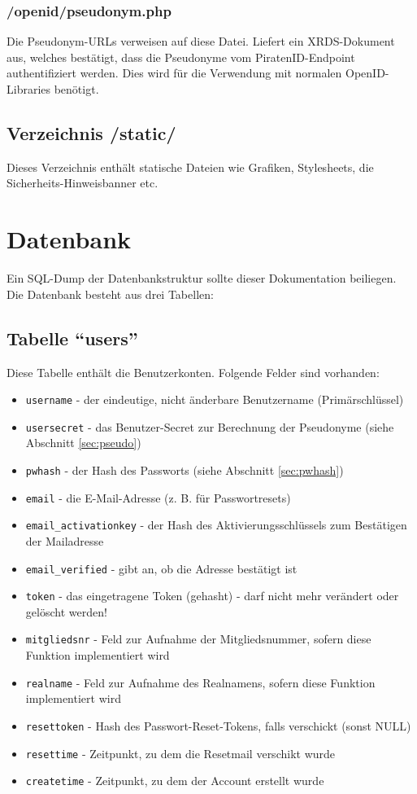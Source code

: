 \documentclass[parskip=half]{scrartcl}
\begin{document}
\subsubsection{/openid/pseudonym.php}
Die Pseudonym-URLs verweisen auf diese Datei.
Liefert ein XRDS-Dokument aus, welches bestätigt, dass die Pseudonyme vom PiratenID-Endpoint authentifiziert werden.
Dies wird für die Verwendung mit normalen OpenID-Libraries benötigt.


\subsection{Verzeichnis /static/}
Dieses Verzeichnis enthält statische Dateien wie Grafiken, Stylesheets, die Sicherheits-Hinweisbanner etc.


\section{Datenbank}
Ein SQL-Dump der Datenbankstruktur sollte dieser Dokumentation beiliegen.
Die Datenbank besteht aus drei Tabellen:

\subsection{Tabelle "`users"'}
Diese Tabelle enthält die Benutzerkonten. Folgende Felder sind vorhanden:
\begin{itemize}
	\item \texttt{username} - der eindeutige, nicht änderbare Benutzername (Primärschlüssel)
	\item \texttt{usersecret} - das Benutzer-Secret zur Berechnung der Pseudonyme (siehe Abschnitt \ref{sec:pseudo})
	\item \texttt{pwhash} - der Hash des Passworts (siehe Abschnitt \ref{sec:pwhash})
	\item \texttt{email} - die E-Mail-Adresse (z. B. für Passwortresets)
	\item \texttt{email\_activationkey} - der Hash des Aktivierungsschlüssels zum Bestätigen der Mailadresse
	\item \texttt{email\_verified} - gibt an, ob die Adresse bestätigt ist
	\item \texttt{token} - das eingetragene Token (gehasht) - darf nicht mehr verändert oder gelöscht werden!
	\item \texttt{mitgliedsnr} - Feld zur Aufnahme der Mitgliedsnummer, sofern diese Funktion implementiert wird
	\item \texttt{realname} - Feld zur Aufnahme des Realnamens, sofern diese Funktion implementiert wird
	\item \texttt{resettoken} - Hash des Passwort-Reset-Tokens, falls verschickt (sonst NULL)
	\item \texttt{resettime} - Zeitpunkt, zu dem die Resetmail verschikt wurde
	\item \texttt{createtime} - Zeitpunkt, zu dem der Account erstellt wurde
\end{itemize}
\end{document}
